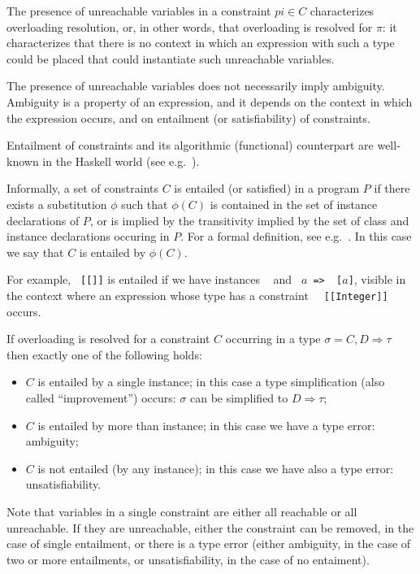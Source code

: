 The presence of unreachable variables in a constraint $pi\in C$
characterizes overloading resolution, or, in other words, that
overloading is resolved for $\pi$: it characterizes that there is no
context in which an expression with such a type could be placed that
could instantiate such unreachable variables.

The presence of unreachable variables does not necessarily imply
ambiguity. Ambiguity is a property of an expression, and it depends on
the context in which the expression occurs, and on entailment (or
satisfiability) of constraints.

Entailment of constraints and its algorithmic (functional) counterpart
are well-known in the Haskell world (see
e.g.~\cite{MarkJones94a,TheoryOfOverloading,JBCS-Ambiguity-and-constrained-polymorphism}).

Informally, a set of constraints $C$ is entailed (or satisfied) in a
program $P$ if there exists a substitution $\phi$ such that $\phi(C)$
is contained in the set of instance declarations of $P$, or is implied
by the transitivity implied by the set of class and instance
declarations occuring in $P$. For a formal definition, see
e.g.~\cite{MarkJones94a,JBCS-Ambiguity-and-constrained-polymorphism}. In
this case we say that $C$ is entailed by $\phi(C)$. 

For example, {\tt \Eq\ [[\Integer]]} is entailed if we have instances
{\tt \Eq\ \Integer} and {\tt \Eq\ $a$ => \Eq\ [$a$]}, visible in the
context where an expression whose type has a constraint {\tt
  \Eq\ [[Integer]]} occurs.

If overloading is resolved for a constraint $C$ occurring in a type
$\sigma = C,D \Rightarrow \tau$ then exactly one of the following
holds:
\begin{itemize}

\item $C$ is entailed by a single instance; in this case a type
  simplification (also called ``improvement'') occurs: $\sigma$ can be
  simplified to $D \Rightarrow \tau$;

\item $C$ is entailed by more than instance; in this case we have a
  type error: ambiguity; 

\item $C$ is not entailed (by any instance); in this case we have also
  a type error: unsatisfiability.

\end{itemize}

Note that variables in a single constraint are either all reachable or
all unreachable. If they are unreachable, either the constraint can be
removed, in the case of single entailment, or there is a type error
(either ambiguity, in the case of two or more entailments, or
unsatisfiability, in the case of no entaiment).

